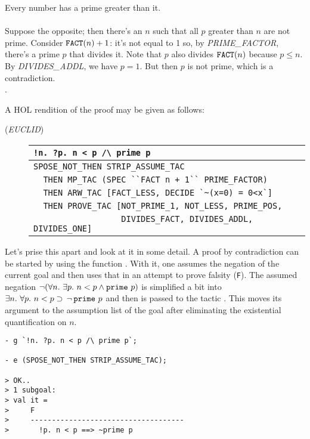  Every number has a prime greater than it.\\
 \\
\noindent Suppose the opposite; then there's an $n$
such that all $p$ greater than $n$ are not prime. Consider $\mbox{\tt
FACT}(n) + 1$: it's not equal to 1 so, by {\small{\it PRIME\_FACTOR}},
there's a prime $p$ that divides it. Note that $p$ also divides
$\mbox{\tt FACT}(n)$ because $p \leq n$. By {\small{\it DIVIDES\_ADDL}},
we have $p=1$. But then $p$ is not prime, which is a contradiction. \\
.

A HOL rendition of the proof may be given as follows:
\begin{description}
\item [\small{({\it EUCLID\/})}]
\begin{tabular}[t]{l}
\verb+!n. ?p. n < p /\ prime p+ \\ \hline
\verb+SPOSE_NOT_THEN STRIP_ASSUME_TAC+ \\
\verb!  THEN MP_TAC (SPEC ``FACT n + 1`` PRIME_FACTOR)! \\
\verb+  THEN ARW_TAC [FACT_LESS, DECIDE `~(x=0) = 0<x`]+ \\
\verb+  THEN PROVE_TAC [NOT_PRIME_1, NOT_LESS, PRIME_POS, + \\
\verb+                  DIVIDES_FACT, DIVIDES_ADDL, DIVIDES_ONE]+ \\
\end{tabular}
\end{description}
Let's prise this apart and look at it in some detail. A proof by
contradiction can be started by using the  function
. With it, one assumes the negation of the
current goal and then uses that in an attempt to prove falsity
(\verb+F+). The assumed negation $\neg(\forall n.\ \exists p.\ n < p
\land \mbox{\tt prime}\ p)$ is simplified a bit into $\exists n.\
\forall p.\ n < p \supset \, \neg \,\mbox{\tt prime}\ p$ and then is
passed to the tactic \ml{STRIP\_ASSUME\_TAC}. This moves its argument
to the assumption list of the goal after eliminating the existential
quantification on $n$.
\begin{session}\begin{verbatim}
- g `!n. ?p. n < p /\ prime p`;

- e (SPOSE_NOT_THEN STRIP_ASSUME_TAC);

> OK..
> 1 subgoal:
> val it =
>     F
>     ------------------------------------
>       !p. n < p ==> ~prime p
\end{verbatim}\end{session}
